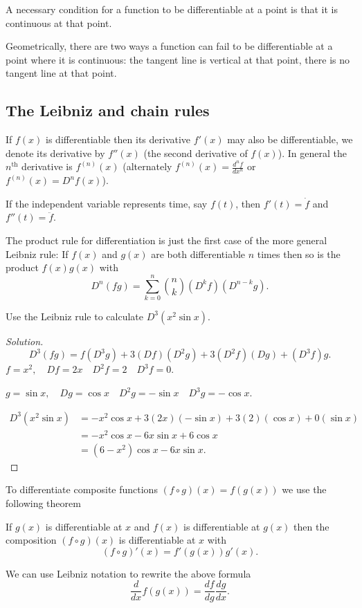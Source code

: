 \documentclass[10pt, a4paper]{article}
\begin{document}
A necessary condition for a function to be differentiable at a point is that it is continuous at that point.

Geometrically, there are two ways a function can fail to be differentiable at a point where it is continuous: the tangent line is vertical at that point, there is no tangent line at that point.

\subsection{The Leibniz and chain rules}
If $f(x)$ is differentiable then its derivative $f'(x)$ may also be differentiable, we denote its derivative by $f''(x)$ (the second derivative of $f(x)$). In general the $n^{\text{th}}$ derivative is $f^{(n)}(x)$ (alternately $f^{(n)}(x) = \frac{d^n f}{dx ^ n}$ or $f^{(n)}(x) = D ^ n f(x)$).

If the independent variable represents time, say $f(t)$, then $f'(t) = \dot{f}$ and $f''(t) = \ddot{f}$.

The product rule for differentiation is just the first case of the more general Leibniz rule:
If $f(x)$ and $g(x)$ are both differentiable $n$ times then so is the product $f(x)g(x)$ with
\[
D ^ n (fg) = \sum_{k = 0}^{n}\binom{n}{k}(D ^ k f)(D ^ {n - k} g).
\]

\begin{example}
    Use the Leibniz rule to calculate $D ^ 3 (x ^ 2 \sin x)$.

    \begin{proof}[Solution]\renewcommand{\qedsymbol}{}
        \[
        D ^ 3 (fg) = f(D ^ 3 g) + 3(Df)(D ^ 2 g) + 3(D ^ 2 f)(D g) + (D ^ 3 f)g.
        \]
        $f = x ^ 2,\quad Df = 2x\quad D ^ 2f = 2\quad D ^ 3 f = 0$.
        
        $g = \sin x,\quad Dg = \cos x\quad D ^ 2g = -\sin x\quad D ^ 3 g = -\cos x$.

        \begin{align*}
            D ^ 3(x ^ 2 \sin x) &= -x ^ 2 \cos x + 3(2x)(-\sin x) + 3(2)(\cos x) + 0(\sin x) \\
            &= -x ^ 2 \cos x - 6x\sin x + 6\cos x \\
            &= (6 - x ^ 2)\cos x - 6x\sin x.
        \end{align*}
    \end{proof}
\end{example}

To differentiate composite functions $(f \circ g)(x) = f(g(x))$ we use the following theorem
\begin{theorem}
    If $g(x)$ is differentiable at $x$ and $f(x)$ is differentiable at $g(x)$ then the composition $(f \circ g)(x)$ is differentiable at $x$ with
    \[
    (f \circ g)'(x) = f'(g(x))g'(x).
    \]
\end{theorem}
We can use Leibniz notation to rewrite the above formula
\[
\frac{d}{dx}f(g(x)) = \frac{df}{dg}\frac{dg}{dx}.
\]
\end{document}
